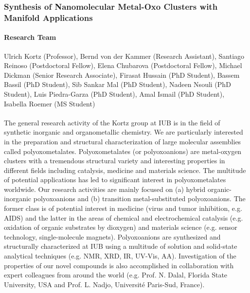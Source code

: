 \subsubsection{Synthesis of Nanomolecular Metal-Oxo Clusters with Manifold Applications}

\paragraph{Research Team}
Ulrich Kortz (Professor), Bernd von der Kammer (Research Assistant), Santiago Reinoso
(Postdoctoral Fellow), Elena Chubarova (Postdoctoral Fellow), Michael Dickman (Senior
Research Associate), Firasat Hussain (PhD Student), Bassem Bassil (PhD Student), Sib
Sankar Mal (PhD Student), Nadeen Nsouli (PhD Student), Luis Piedra-Garza (PhD Student),
Amal Ismail (PhD Student),
Isabella Roemer (MS Student) \ \ \\ \ \ \\


The general research activity of the Kortz group at
IUB is in the field of synthetic inorganic and organometallic
chemistry. We are particularly interested in the preparation and
structural characterization of large molecular assemblies called
polyoxometalates. Polyoxometalates (or polyoxoanions) are
metal-oxygen clusters with a tremendous structural variety and
interesting properties in different fields including catalysis,
medicine and materials science. The multitude of potential
applications has led to significant interest in polyoxometalates
worldwide. Our research activities are mainly focused on (a)
hybrid organic-inorganic polyoxoanions and (b) transition
metal-substituted polyoxoanions. The former class is of potential
interest in medicine (virus and tumor inhibition, e.g. AIDS) and
the latter in the areas of chemical and electrochemical catalysis
(e.g. oxidation of organic substrates by dioxygen) and materials
science (e.g. sensor technology, single-molecule magnets).
Polyoxoanions are synthesized and structurally characterized at
IUB using a multitude of solution and solid-state analytical
techniques (e.g. NMR, XRD, IR, UV-Vis, AA). Investigation of the
properties of our novel compounds is also accomplished in
collaboration with expert colleagues from around the world (e.g.
Prof. N. Dalal, Florida State University, USA and Prof. L. Nadjo,
Universit\'{e} Paris-Sud, France).



